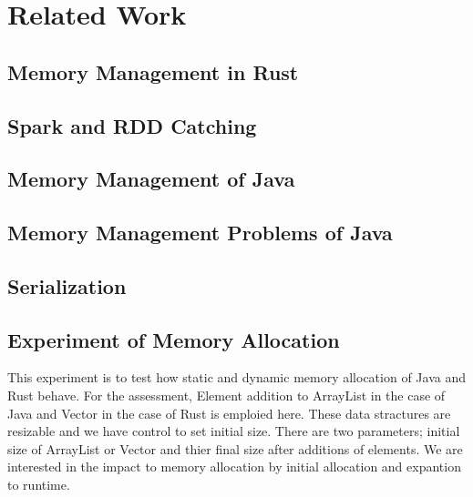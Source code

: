 \chapter{Related Work}
\label{chapter:relatedwork}
\thispagestyle{myheadings}

\graphicspath{{2_RelatedWork/Figures/}}

\section{Memory Management in Rust}
\label{sec:history}



\section{Spark and RDD Catching}
\label{sec:history}




\section{Memory Management of Java}
\label{sec:history}


\section{Memory Management Problems of Java}
\label{sec:history}


\section{Serialization}
\label{sec:history}



\section{Experiment of Memory Allocation}
\label{sec:history}
This experiment is to test how static and dynamic memory allocation of Java and Rust behave. For the assessment, Element addition to ArrayList in the case of Java and Vector in the case of Rust 
is emploied here. These data stractures are resizable and we have control to set initial size. There are two parameters; initial size of ArrayList or Vector and thier final size after additions of elements. 
We are interested in the impact to memory allocation by initial allocation and expantion to runtime.

